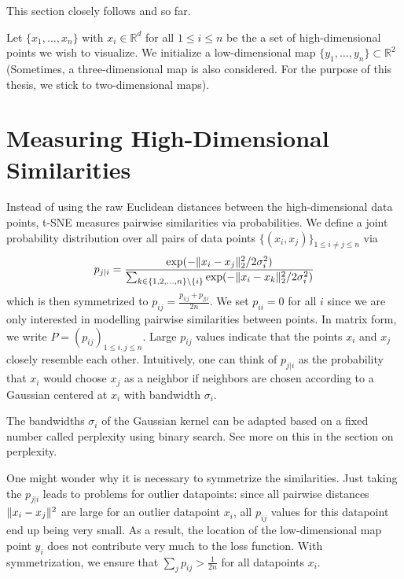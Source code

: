 This section closely follows \cite{Cai22} and \cite{vdMaa08} so far. 

Let $\{x_1, \dots , x_n \}$ with $x_i \in \mathbb{R}^d$ for all $1 \leq i \leq n$ be the a set of high-dimensional points we wish to visualize.
We initialize a low-dimensional map $\{y_1, \dots , y_n\} \subset \mathbb{R}^2$ (Sometimes, a three-dimensional map is also considered. For the purpose of this thesis, we stick to two-dimensional maps). 

\section{Measuring High-Dimensional Similarities}

Instead of using the raw Euclidean distances between the high-dimensional data points, t-SNE measures pairwise similarities via probabilities. 
We define a joint probability distribution over all pairs of data points $\{(x_i, x_j)\}_{1 \leq i \neq j \leq n}$ via  
\begin{equation}
    p_{j|i} =  \frac{\exp(-\lVert x_i - x_j\rVert_2^2 / 2\sigma_i^2)}{\sum_{k \in \{1,2, \dots, n\} \backslash \{i\}} \exp({-\lVert x_i - x_k\rVert_2^2 / 2 \sigma_i^2})}
\end{equation}
which is then symmetrized to $p_{ij} = \frac{p_{i|j} + p_{j|i}}{2n}$. We set $p_{ii}=0$ for all $i$ since we are only interested in modelling pairwise similarities between points. In matrix form, we write $P = (p_{ij})_{1 \leq i, j \leq n}$. 
Large $p_{ij}$ values indicate that the points $x_i$ and $x_j$ closely resemble each other. 
Intuitively, one can think of $p_{j|i}$ as the probability that $x_i$ would choose $x_j$ as a neighbor if neighbors are chosen according to a Gaussian centered at $x_i$ with bandwidth $\sigma_i$. 

The bandwidths $\sigma_i$ of the Gaussian kernel can be adapted based on a fixed number called perplexity using binary search. See more on this in the section on perplexity. 

One might wonder why it is necessary to symmetrize the similarities. Just taking the $p_{j|i}$ leads to problems for outlier datapoints: since all pairwise distances $\lVert x_i - x_j\rVert^2$ are large for an outlier datapoint $x_i$, all $p_{ij}$ values for this datapoint end up being very small. 
As a result, the location of the low-dimensional map point $y_i$ does not contribute very much to the loss function. With symmetrization, we ensure that $\sum_{j} p_{ij} > \frac{1}{2n}$ for all datapoints $x_i$. 

